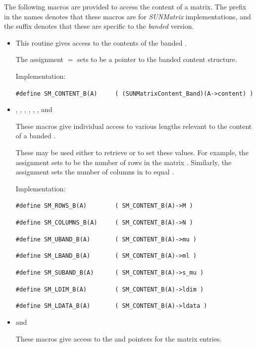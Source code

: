 The following macros are provided to access the
content of a {\sunmatband} matrix. The prefix  in the names
denotes that these macros are for \emph{SUNMatrix} implementations,
and the suffix  denotes that these are specific to
the \emph{banded} version.
\begin{itemize}

\item {}

  This routine gives access to the contents of the
  banded .

  The assignment  $=$  sets
   to be a pointer to the banded  content
  structure.

  Implementation:

  \verb|#define SM_CONTENT_B(A)     ( (SUNMatrixContent_Band)(A->content) )|

\item {}, , , , , , and 

  These macros give individual access to various lengths relevant to the
  content of a banded .

  These may be used either to retrieve or to set these values.  For
  example, the assignment  sets  to be
  the number of rows in the matrix .  Similarly, the
  assignment  sets the number of
  columns in  to equal .

  Implementation:

  \verb|#define SM_ROWS_B(A)        ( SM_CONTENT_B(A)->M )|

  \verb|#define SM_COLUMNS_B(A)     ( SM_CONTENT_B(A)->N )|

  \verb|#define SM_UBAND_B(A)       ( SM_CONTENT_B(A)->mu )|

  \verb|#define SM_LBAND_B(A)       ( SM_CONTENT_B(A)->ml )|

  \verb|#define SM_SUBAND_B(A)      ( SM_CONTENT_B(A)->s_mu )|

  \verb|#define SM_LDIM_B(A)        ( SM_CONTENT_B(A)->ldim )|

  \verb|#define SM_LDATA_B(A)       ( SM_CONTENT_B(A)->ldata )|

\item {} and 

  These macros give access to the  and  pointers for
  the matrix entries.


\end{itemize}

